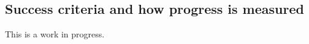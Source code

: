 \documentclass[11pt,letterpaper]{article}
\begin{document}

\subsection{Success criteria and how progress is measured}
This is a work in progress.
 
\end{document}
